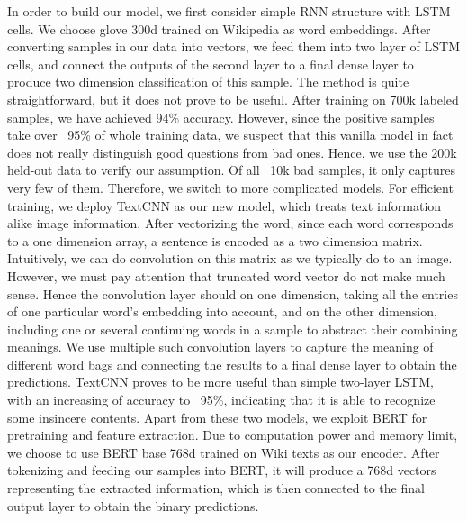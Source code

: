 \documentclass{article}
\begin{document}
In order to build our model, we first consider simple RNN structure with LSTM cells. We choose glove 300d trained on Wikipedia as word embeddings. After converting samples in our data into vectors, we feed them into two layer of LSTM cells, and connect the outputs of the second layer to a final dense layer to produce two dimension classification of this sample. The method is quite straightforward, but it does not prove to be useful. After training on 700k labeled samples, we have achieved 94\% accuracy. However, since the positive samples take over ~95\% of whole training data, we suspect that this vanilla model in fact does not really distinguish good questions from bad ones. Hence, we use the 200k held-out data to verify our assumption. Of all ~10k bad samples, it only captures very few of them. Therefore, we switch to more complicated models. For efficient training, we deploy TextCNN as our new model, which treats text information alike image information. After vectorizing the word, since each word corresponds to a one dimension array, a sentence is encoded as a two dimension matrix. Intuitively, we can do convolution on this matrix as we typically do to an image. However, we must pay attention that truncated word vector do not make much sense. Hence the convolution layer should on one dimension, taking all the entries of one particular word's embedding into account, and on the other dimension, including one or several continuing words in a sample to abstract their combining meanings. We use multiple such convolution layers to capture the meaning of different word bags and connecting the results to a final dense layer to obtain the predictions. TextCNN proves to be more useful than simple two-layer LSTM, with an increasing of accuracy to ~95\%, indicating that it is able to recognize some insincere contents. Apart from these two models, we exploit BERT for pretraining and feature extraction. Due to computation power and memory limit, we choose to use BERT base 768d trained on Wiki texts as our encoder. After tokenizing and feeding our samples into BERT, it will produce a 768d vectors representing the extracted information, which is then connected to the final output layer to obtain the binary predictions.
\end{document}
